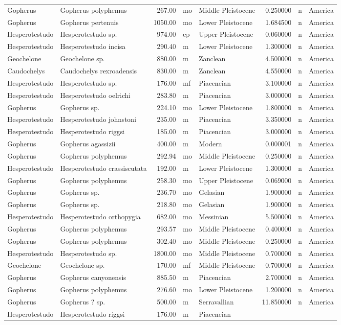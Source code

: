 \documentclass[]{article}
\begin{document}
\begin{longtable}[]{@{}llrllrll@{}}
Gopherus & Gopherus polyphemus & 267.00 & mo & Middle Pleistocene &
0.250000 & n & America\tabularnewline
Gopherus & Gopherus pertenuis & 1050.00 & mo & Lower Pleistocene &
1.684500 & n & America\tabularnewline
Hesperotestudo & Hesperotestudo sp. & 974.00 & ep & Upper Pleistocene &
0.060000 & n & America\tabularnewline
Hesperotestudo & Hesperotestudo incisa & 290.40 & m & Lower Pleistocene
& 1.300000 & n & America\tabularnewline
Geochelone & Geochelone sp. & 880.00 & m & Zanclean & 4.500000 & n &
America\tabularnewline
Caudochelys & Caudochelys rexroadensis & 830.00 & m & Zanclean &
4.550000 & n & America\tabularnewline
Hesperotestudo & Hesperotestudo sp. & 176.00 & mf & Piacencian &
3.100000 & n & America\tabularnewline
Hesperotestudo & Hesperotestudo oelrichi & 283.80 & m & Piacencian &
3.000000 & n & America\tabularnewline
Gopherus & Gopherus sp. & 224.10 & mo & Lower Pleistocene & 1.800000 & n
& America\tabularnewline
Hesperotestudo & Hesperotestudo johnstoni & 235.00 & m & Piacencian &
3.350000 & n & America\tabularnewline
Hesperotestudo & Hesperotestudo riggsi & 185.00 & m & Piacencian &
3.000000 & n & America\tabularnewline
Gopherus & Gopherus agassizii & 400.00 & m & Modern & 0.000001 & n &
America\tabularnewline
Gopherus & Gopherus polyphemus & 292.94 & mo & Middle Pleistocene &
0.250000 & n & America\tabularnewline
Hesperotestudo & Hesperotestudo crassiscutata & 192.00 & m & Lower
Pleistocene & 1.300000 & n & America\tabularnewline
Gopherus & Gopherus polyphemus & 258.30 & mo & Upper Pleistocene &
0.069000 & n & America\tabularnewline
Gopherus & Gopherus sp. & 236.70 & mo & Gelasian & 1.900000 & n &
America\tabularnewline
Gopherus & Gopherus sp. & 218.80 & mo & Gelasian & 1.900000 & n &
America\tabularnewline
Hesperotestudo & Hesperotestudo orthopygia & 682.00 & mo & Messinian &
5.500000 & n & America\tabularnewline
Gopherus & Gopherus polyphemus & 293.57 & mo & Middle Pleistocene &
0.400000 & n & America\tabularnewline
Gopherus & Gopherus polyphemus & 302.40 & mo & Middle Pleistocene &
0.250000 & n & America\tabularnewline
Hesperotestudo & Hesperotestudo sp. & 1800.00 & mo & Middle Pleistocene
& 0.700000 & n & America\tabularnewline
Geochelone & Geochelone sp. & 170.00 & mf & Middle Pleistocene &
0.700000 & n & America\tabularnewline
Gopherus & Gopherus canyonensis & 885.50 & m & Piacencian & 2.700000 & n
& America\tabularnewline
Gopherus & Gopherus polyphemus & 276.60 & mo & Lower Pleistocene &
1.200000 & n & America\tabularnewline
Gopherus & Gopherus ? sp. & 500.00 & m & Serravallian & 11.850000 & n &
America\tabularnewline
Hesperotestudo & Hesperotestudo riggsi & 176.00 & m & Piacencian &

\end{longtable}
\end{document}
